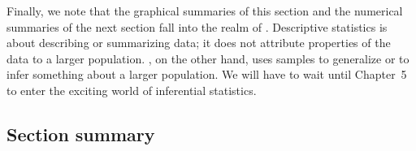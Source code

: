 Finally, we note that the graphical summaries of this section and the numerical summaries of the next section fall into the realm of .  Descriptive statistics is about describing or summarizing data; it does not attribute properties of the data to a larger population.  , on the other hand, uses samples to generalize or to infer something about a larger population.  We will have to wait until Chapter~5 to enter the exciting world of inferential statistics.

\D{\newpage}

\subsection*{Section summary}

